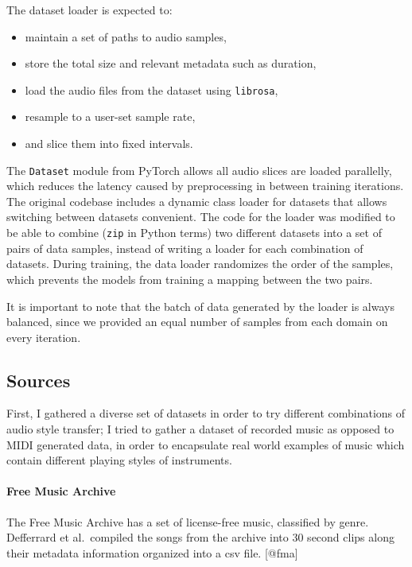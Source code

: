 \documentclass[12pt,a4paper,]{report}
\providecommand{\tightlist}{%
  \setlength{\itemsep}{0pt}\setlength{\parskip}{0pt}}
\begin{document}
The dataset loader is expected to:

\begin{itemize}
\tightlist
\item
  maintain a set of paths to audio samples,
\item
  store the total size and relevant metadata such as duration,
\item
  load the audio files from the dataset using \texttt{librosa},
\item
  resample to a user-set sample rate,
\item
  and slice them into fixed intervals.
\end{itemize}

The \texttt{Dataset} module from PyTorch allows all audio slices are
loaded parallelly, which reduces the latency caused by preprocessing in
between training iterations. The original codebase includes a dynamic
class loader for datasets that allows switching between datasets
convenient. The code for the loader was modified to be able to combine
(\texttt{zip} in Python terms) two different datasets into a set of
pairs of data samples, instead of writing a loader for each combination
of datasets. During training, the data loader randomizes the order of
the samples, which prevents the models from training a mapping between
the two pairs.

It is important to note that the batch of data generated by the loader
is always balanced, since we provided an equal number of samples from
each domain on every iteration.

\hypertarget{sources}{%
\subsection{Sources}\label{sources}}

First, I gathered a diverse set of datasets in order to try different
combinations of audio style transfer; I tried to gather a dataset of
recorded music as opposed to MIDI generated data, in order to
encapsulate real world examples of music which contain different playing
styles of instruments.

\paragraph{Free Music Archive}

The Free Music Archive has a set of license-free music, classified by
genre. Defferrard et al.~compiled the songs from the archive into 30
second clips along their metadata information organized into a csv file.
{[}@fma{]}
\end{document}
